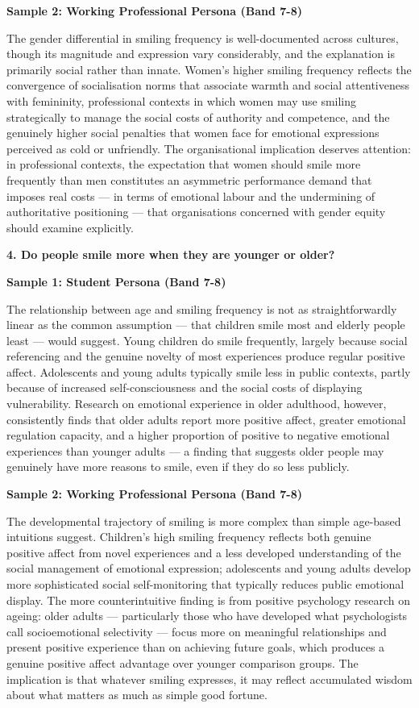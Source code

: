 \textbf{Sample 2: Working Professional Persona (Band 7-8)}

The gender differential in smiling frequency is well-documented across cultures, though its magnitude and expression vary considerably, and the explanation is primarily social rather than innate. Women's higher smiling frequency reflects the convergence of socialisation norms that associate warmth and social attentiveness with femininity, professional contexts in which women may use smiling strategically to manage the social costs of authority and competence, and the genuinely higher social penalties that women face for emotional expressions perceived as cold or unfriendly. The organisational implication deserves attention: in professional contexts, the expectation that women should smile more frequently than men constitutes an asymmetric performance demand that imposes real costs — in terms of emotional labour and the undermining of authoritative positioning — that organisations concerned with gender equity should examine explicitly.

\separator

\begin{ieltsquestion}
\textbf{4. Do people smile more when they are younger or older?}
\end{ieltsquestion}
\textbf{Sample 1: Student Persona (Band 7-8)}

The relationship between age and smiling frequency is not as straightforwardly linear as the common assumption — that children smile most and elderly people least — would suggest. Young children do smile frequently, largely because social referencing and the genuine novelty of most experiences produce regular positive affect. Adolescents and young adults typically smile less in public contexts, partly because of increased self-consciousness and the social costs of displaying vulnerability. Research on emotional experience in older adulthood, however, consistently finds that older adults report more positive affect, greater emotional regulation capacity, and a higher proportion of positive to negative emotional experiences than younger adults — a finding that suggests older people may genuinely have more reasons to smile, even if they do so less publicly.

\textbf{Sample 2: Working Professional Persona (Band 7-8)}

The developmental trajectory of smiling is more complex than simple age-based intuitions suggest. Children's high smiling frequency reflects both genuine positive affect from novel experiences and a less developed understanding of the social management of emotional expression; adolescents and young adults develop more sophisticated social self-monitoring that typically reduces public emotional display. The more counterintuitive finding is from positive psychology research on ageing: older adults — particularly those who have developed what psychologists call socioemotional selectivity — focus more on meaningful relationships and present positive experience than on achieving future goals, which produces a genuine positive affect advantage over younger comparison groups. The implication is that whatever smiling expresses, it may reflect accumulated wisdom about what matters as much as simple good fortune.

